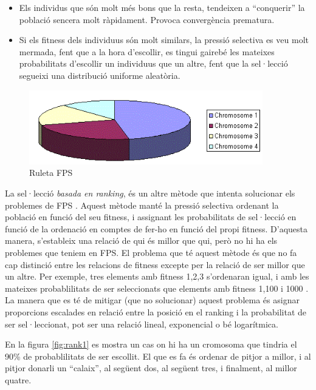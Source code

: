 \begin{itemize}
	\item Els individus que són molt més bons que la resta, tendeixen a
	``conquerir'' la població sencera molt ràpidament. Provoca convergència
	prematura.
	\item Si els fitness dels individuus són molt similars, la pressió selectiva
	es veu molt mermada, fent que a la hora d'escollir, es tingui gairebé les
	mateixes probabilitats d'escollir un individuus que un altre, fent que la
	sel·lecció segueixi una distribució uniforme aleatòria.
\end{itemize}


\begin{figure} \centering \includegraphics[width=4in]{intro/rwsgraph.png}
\caption{\label{fig:rwsgraph}Ruleta FPS}
\end{figure}

La sel·lecció \emph{basada en ranking}, és un altre mètode que intenta
solucionar els problemes de FPS \cite{B87a}.  Aquest mètode manté la pressió
selectiva ordenant la població en funció del seu fitness, i assignant les
probabilitats de sel·lecció en funció de la ordenació en comptes de fer-ho en
funció del propi fitness. D'aquesta manera, s'estableix una relació de qui és
millor que qui, però no hi ha els problemes que teniem en FPS.  El problema que
té aquest mètode és que no fa cap distinció entre les relacions de fitness
excepte per la relació de ser millor que un altre.  Per exemple, tres elements
amb fitness 1,2,3 s'ordenaran igual, i amb les mateixes probablilitats de ser
seleccionats que elements amb fitness 1,100 i 1000 .  La manera que es té de
mitigar (que no solucionar) aquest problema és asignar proporcions escalades en
relació entre la posició en el ranking i la probabilitat de ser sel·leccionat,
pot ser una relació lineal, exponencial o bé logarítmica. 

En la figura \ref{fig:rank1} es mostra  un cas on hi ha un cromosoma que tindria
el 90\% de probablilitats de ser escollit. El que es fa és ordenar de pitjor a
millor, i al pitjor donarli un ``calaix'', al següent dos, al següent tres, i
finalment, al millor quatre. 

